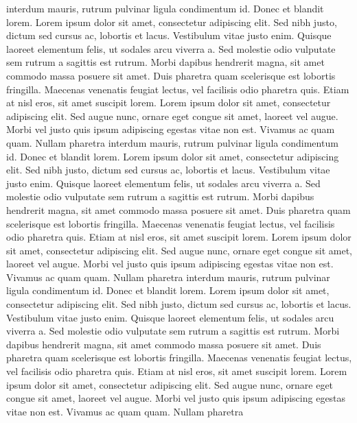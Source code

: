                                                     interdum mauris, rutrum pulvinar ligula condimentum id. Donec et blandit lorem. Lorem ipsum dolor sit amet, consectetur adipiscing elit. Sed nibh justo, dictum sed cursus ac, lobortis et lacus. Vestibulum vitae justo enim. Quisque laoreet elementum felis, ut sodales arcu viverra a. Sed molestie odio vulputate sem rutrum a sagittis est rutrum. Morbi dapibus hendrerit magna, sit amet commodo massa posuere sit amet. Duis pharetra quam scelerisque est lobortis fringilla. Maecenas venenatis feugiat lectus, vel facilisis odio pharetra quis. Etiam at nisl eros, sit amet suscipit lorem. Lorem ipsum dolor sit amet, consectetur adipiscing elit. Sed augue nunc, ornare eget congue sit amet, laoreet vel augue. Morbi vel justo quis ipsum adipiscing egestas vitae non est. Vivamus ac quam quam. Nullam pharetra
                                                    interdum mauris, rutrum pulvinar ligula condimentum id. Donec et blandit lorem. Lorem ipsum dolor sit amet, consectetur adipiscing elit. Sed nibh justo, dictum sed cursus ac, lobortis et lacus. Vestibulum vitae justo enim. Quisque laoreet elementum felis, ut sodales arcu viverra a. Sed molestie odio vulputate sem rutrum a sagittis est rutrum. Morbi dapibus hendrerit magna, sit amet commodo massa posuere sit amet. Duis pharetra quam scelerisque est lobortis fringilla. Maecenas venenatis feugiat lectus, vel facilisis odio pharetra quis. Etiam at nisl eros, sit amet suscipit lorem. Lorem ipsum dolor sit amet, consectetur adipiscing elit. Sed augue nunc, ornare eget congue sit amet, laoreet vel augue. Morbi vel justo quis ipsum adipiscing egestas vitae non est. Vivamus ac quam quam. Nullam pharetra
                                                    interdum mauris, rutrum pulvinar ligula condimentum id. Donec et blandit lorem. Lorem ipsum dolor sit amet, consectetur adipiscing elit. Sed nibh justo, dictum sed cursus ac, lobortis et lacus. Vestibulum vitae justo enim. Quisque laoreet elementum felis, ut sodales arcu viverra a. Sed molestie odio vulputate sem rutrum a sagittis est rutrum. Morbi dapibus hendrerit magna, sit amet commodo massa posuere sit amet. Duis pharetra quam scelerisque est lobortis fringilla. Maecenas venenatis feugiat lectus, vel facilisis odio pharetra quis. Etiam at nisl eros, sit amet suscipit lorem. Lorem ipsum dolor sit amet, consectetur adipiscing elit. Sed augue nunc, ornare eget congue sit amet, laoreet vel augue. Morbi vel justo quis ipsum adipiscing egestas vitae non est. Vivamus ac quam quam. Nullam pharetra
